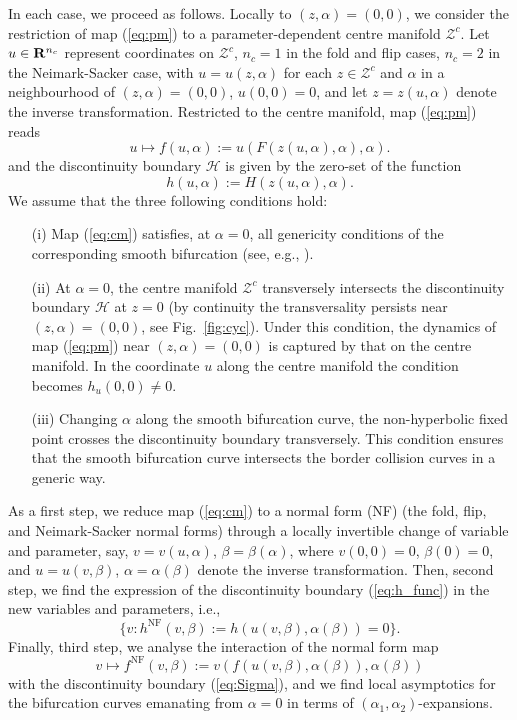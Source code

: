 \documentclass[final,onefignum]{siamltex}
\begin{document}
In each case, we proceed as follows. Locally to $(z,\alpha)=(0,0)$, we
consider the restriction of map (\ref{eq:pm}) to a parameter-dependent
centre manifold $\mathcal{Z}^c$.
Let $u\in{{\bf R}}^{n_c}$ represent coordinates on $\mathcal{Z}^c$, $n_c=1$ in the
fold and flip cases, $n_c=2$ in the Neimark-Sacker case, with $u=u(z,\alpha)$
for each $z\in\mathcal{Z}^c$ and $\alpha$ in a neighbourhood of
$(z,\alpha)=(0,0)$, $u(0,0)=0$, and let $z=z(u,\alpha)$ denote the inverse
transformation. Restricted to the centre manifold, map (\ref{eq:pm}) reads
\begin{equation}
\label{eq:cm}
u\mapsto f(u,\alpha):=u(F(z(u,\alpha),\alpha),\alpha).
\end{equation}
and the discontinuity boundary $\mathcal{H}$ is given by the zero-set of the function
\begin{equation}
\label{eq:h_func}
h(u,\alpha):=H(z(u,\alpha),\alpha).
\end{equation}
We assume that the three following conditions hold:
\begin{itemize}
 \item[(i)] Map (\ref{eq:cm}) satisfies, at $\alpha=0$, all genericity conditions of the corresponding smooth bifurcation (see, e.g., \citep{Kuznetsov04}).
 \item[(ii)] At $\alpha=0$, the centre manifold $\mathcal{Z}^c$ transversely intersects the
discontinuity boundary $\mathcal{H}$ at $z=0$ (by continuity the transversality persists near $(z,\alpha)=(0,0)$, see Fig.~\ref{fig:cyc}).  Under this condition, the dynamics of map (\ref{eq:pm}) near $(z,\alpha)=(0,0)$ is captured by that on the centre manifold.  In the coordinate $u$ along the centre manifold the condition becomes $h_u(0,0)\neq 0$.
 \item[(iii)] Changing $\alpha$ along the smooth bifurcation curve, the non-hyperbolic fixed point crosses the discontinuity boundary transversely.  This condition ensures that the smooth bifurcation curve intersects the border collision curves in a generic way.
\end{itemize}
As a first step, we reduce map (\ref{eq:cm}) to a normal form (NF)
(the fold, flip, and Neimark-Sacker normal forms)
through a locally invertible change of variable and parameter, say, 
$v=v(u,\alpha)$, $\beta=\beta(\alpha)$, where $v(0,0)=0$, $\beta(0)=0$, and
$u=u(v,\beta)$, $\alpha=\alpha(\beta)$ denote the inverse transformation.
Then, second step, we find the expression of the discontinuity boundary (\ref{eq:h_func}) 
in the new variables and parameters, i.e.,
\begin{equation}
\label{eq:Sigma}
\{v:h^{\mathrm{NF}}(v,\beta):=h(u(v,\beta),\alpha(\beta))=0\}. 
\end{equation}
Finally, third step, we analyse the interaction of the normal form map
$$
v\mapsto f^{\mathrm{NF}}(v,\beta):=
v(f(u(v,\beta),\alpha(\beta)),\alpha(\beta))
$$
with the discontinuity boundary (\ref{eq:Sigma}), and we find local asymptotics for the bifurcation curves emanating from $\alpha=0$ in terms of $(\alpha_1,\alpha_2)$-expansions.
\end{document}
